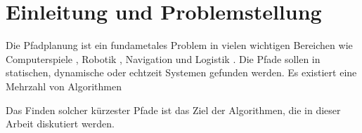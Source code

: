 \chapter{Einleitung und Problemstellung}



Die Pfadplanung ist ein fundametales Problem in vielen wichtigen Bereichen wie Computerspiele \cite{}, Robotik \cite{}, Navigation und Logistik \cite{Botea.2011}. 
Die Pfade sollen in statischen, dynamische oder echtzeit Systemen gefunden werden. Es existiert eine Mehrzahl von Algorithmen 




Das Finden solcher kürzester Pfade ist das Ziel der Algorithmen, die in dieser Arbeit diskutiert werden.
